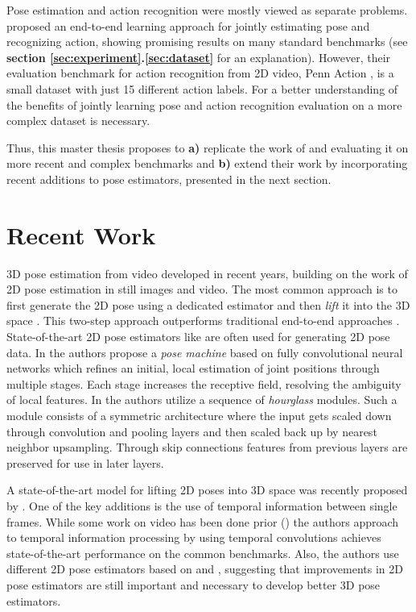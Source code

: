 \documentclass[twoside]{article}
\begin{document}
\begin{multicols}{2}
Pose estimation and action recognition were mostly viewed as separate problems.
\cite{luvizon_2d/3d_2018} proposed an end-to-end learning approach for jointly estimating pose and recognizing action, showing promising results on many standard benchmarks (see \textbf{section \ref{sec:experiment}.\ref{sec:dataset}} for an explanation).
However, their evaluation benchmark for action recognition from 2D video, Penn Action \cite{zhang_actemes_2013}, is a small dataset with just 15 different action labels.
For a better understanding of the benefits of jointly learning pose and action recognition evaluation on a more complex dataset is necessary.

Thus, this master thesis proposes to \textbf{a)} replicate the work of \cite{luvizon_2d/3d_2018} and evaluating it on more recent and complex benchmarks and \textbf{b)} extend their work by incorporating recent additions to pose estimators, presented in the next section.

\section{Recent Work}
\label{sec:recent}
3D pose estimation from video developed in recent years, building on the work of 2D pose estimation in still images and video.
The most common approach is to first generate the 2D pose using a dedicated estimator and then \textit{lift} it into the 3D space \cite{pavllo_3d_2019}\cite{martinez_simple_2017}.
This two-step approach outperforms traditional end-to-end approaches \cite{pavllo_3d_2019}.
State-of-the-art 2D pose estimators like \cite{newell_stacked_2016}\cite{wei_convolutional_2016} are often used for generating 2D pose data.
In \cite{wei_convolutional_2016} the authors propose a \textit{pose machine} based on fully convolutional neural networks which refines an initial, local estimation of joint positions through multiple stages.
Each stage increases the receptive field, resolving the ambiguity of local features.
In \cite{newell_stacked_2016} the authors utilize a sequence of \textit{hourglass} modules.
Such a module consists of a symmetric architecture where the input gets scaled down through convolution and pooling layers and then scaled back up by nearest neighbor upsampling.
Through skip connections features from previous layers are preserved for use in later layers.

A state-of-the-art model for lifting 2D poses into 3D space was recently proposed by \cite{pavllo_3d_2019}.
One of the key additions is the use of temporal information between single frames.
While some work on video has been done prior (\cite{lin_recurrent_2017}\cite{hossain_exploiting_2018}) the authors approach to temporal information processing by using temporal convolutions achieves state-of-the-art performance on the common benchmarks.
Also, the authors use different 2D pose estimators based on \cite{he_mask_2017} and \cite{chen_cascaded_2018}, suggesting that improvements in 2D pose estimators are still important and necessary to develop better 3D pose estimators.


\end{multicols}
\end{document}
